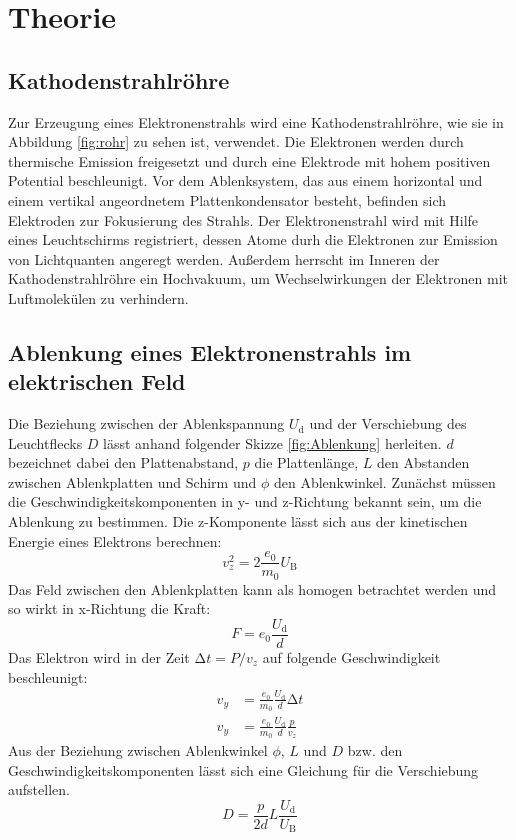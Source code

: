 \section{Theorie}
\label{sec:Theorie}

\subsection{Kathodenstrahlröhre}
\label{sec:Kathodenstrahlröhre}

Zur Erzeugung eines Elektronenstrahls wird eine Kathodenstrahlröhre, wie sie in Abbildung \ref{fig:rohr} zu sehen ist, verwendet.
Die Elektronen werden durch thermische Emission freigesetzt und durch eine Elektrode mit hohem positiven Potential beschleunigt.
Vor dem Ablenksystem, das aus einem horizontal und einem vertikal angeordnetem Plattenkondensator besteht, befinden sich Elektroden zur Fokusierung des Strahls.
Der Elektronenstrahl wird mit Hilfe eines Leuchtschirms registriert, dessen Atome durh die Elektronen zur Emission von Lichtquanten angeregt werden.
Außerdem herrscht im Inneren der Kathodenstrahlröhre ein Hochvakuum, um Wechselwirkungen der Elektronen mit Luftmolekülen zu verhindern.

\subsection{Ablenkung eines Elektronenstrahls im elektrischen Feld}
\label{sec:elekAblenkung}

Die Beziehung zwischen der Ablenkspannung $U_\text{d}$ und der Verschiebung des Leuchtflecks $D$ lässt anhand folgender Skizze \ref{fig:Ablenkung} herleiten.
$d$ bezeichnet dabei den Plattenabstand, $p$ die Plattenlänge, $L$ den Abstanden zwischen Ablenkplatten und Schirm und $\phi$ den Ablenkwinkel.
Zunächst müssen die Geschwindigkeitskomponenten in y- und z-Richtung bekannt sein, um die Ablenkung zu bestimmen.
Die z-Komponente lässt sich aus der kinetischen Energie eines Elektrons berechnen:
\begin{equation}
  v_z^2 = 2 \frac{e_0}{m_0} U_\text{B}
\end{equation}
Das Feld zwischen den Ablenkplatten kann als homogen betrachtet werden und so wirkt in x-Richtung die Kraft:
\begin{equation}
  F = e_0 \frac{U_\text{d}}{d}
\end{equation}
Das Elektron wird in der Zeit $\increment t = P / v_z$ auf folgende Geschwindigkeit beschleunigt:
\begin{align}
  v_y & = \frac{e_0}{m_0} \frac{U_\text{d}}{d} \increment t \\
  v_y & = \frac{e_0}{m_0} \frac{U_\text{d}}{d} \frac{p}{v_z}
\end{align}
Aus der Beziehung zwischen Ablenkwinkel $\phi$, $L$ und $D$ bzw. den Geschwindigkeitskomponenten lässt sich eine Gleichung für die Verschiebung aufstellen.
\begin{equation}
  D = \frac{p}{2d} L \frac{U_\text{d}}{U_\text{B}}
\end{equation}


